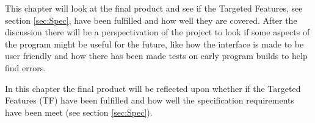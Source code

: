 This chapter will look at the final product and see if the Targeted Features, see section \ref{sec:Spec}, have been fulfilled and how well they are covered. After the discussion there will be a perspectivation of the project to look if some aspects of the program might be useful for the future, like how the interface is made to be user friendly and how there has been made tests on early program builds to help find errors.

In this chapter the final product will be reflected upon whether if the Targeted Features (TF) have been fulfilled and how well the specification requirements have been meet (see section \ref{sec:Spec}).